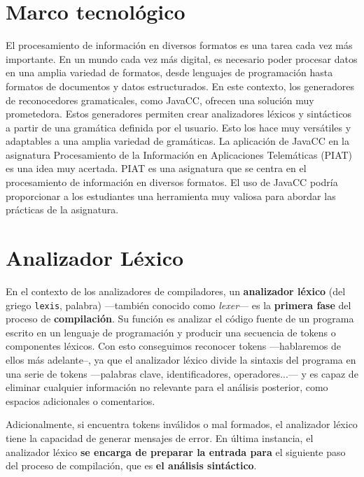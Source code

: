 \section{Marco tecnológico}
El procesamiento de información en diversos formatos es una tarea cada vez más importante. En un mundo cada vez más digital, es necesario poder procesar datos en una amplia variedad de formatos, desde lenguajes de programación hasta formatos de documentos y datos estructurados.
En este contexto, los generadores de reconocedores gramaticales, como JavaCC, ofrecen una solución muy prometedora. Estos generadores permiten crear analizadores léxicos y sintácticos a partir de una gramática definida por el usuario. Esto los hace muy versátiles y adaptables a una amplia variedad de gramáticas.
La aplicación de JavaCC en la asignatura Procesamiento de la Información en Aplicaciones Telemáticas (PIAT) es una idea muy acertada. PIAT es una asignatura que se centra en el procesamiento de información en diversos formatos. El uso de JavaCC podría proporcionar a los estudiantes una herramienta muy valiosa para abordar las prácticas de la asignatura.





\section{Analizador Léxico}
En el contexto de los analizadores de compiladores, un \textbf{analizador léxico} (del griego \lstinline|lexis|, palabra) ---también conocido como \textit{lexer}--- es la \textbf{primera fase} del proceso de \textbf{compilación}. Su función es analizar el código fuente de un programa escrito en un lenguaje de programación y producir una secuencia de tokens o componentes léxicos\cite{lexer}. Con esto conseguimos reconocer tokens ---hablaremos de ellos más adelante--, ya que el analizador léxico divide la sintaxis del programa en una serie de tokens ---palabras clave, identificadores, operadores...--- y es capaz de eliminar cualquier información no relevante para el análisis posterior, como espacios adicionales o comentarios. 

Adicionalmente, si encuentra tokens inválidos o mal formados, el analizador léxico tiene la capacidad de generar mensajes de error. En última instancia, el analizador léxico \textbf{se encarga de preparar la entrada para} el siguiente paso del proceso de compilación, que es \textbf{el análisis sintáctico}.



